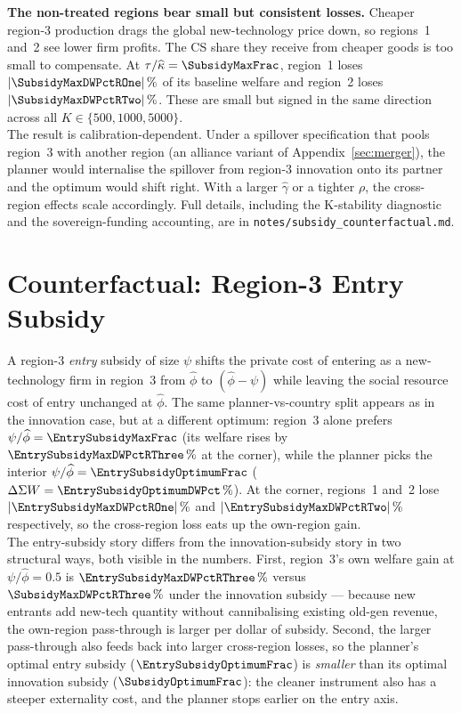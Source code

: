 \documentclass[12pt]{article}
\begin{document}
\textbf{The non-treated regions bear small but consistent losses.}
Cheaper region-3 production drags the global new-technology price down,
so regions~1 and~2 see lower firm profits. The CS share they receive
from cheaper goods is too small to compensate. At
$\tau / \widehat{\kappa} = \SubsidyMaxFrac$, region~1 loses
$|\SubsidyMaxDWPctROne|\,\%$ of its baseline welfare and region~2 loses
$|\SubsidyMaxDWPctRTwo|\,\%$. These are small but signed in the same
direction across all $K \in \{500, 1000, 5000\}$.\\

The result is calibration-dependent. Under a spillover specification
that pools region~3 with another region (an alliance variant of
Appendix~\ref{sec:merger}), the planner would internalise the spillover
from region-3 innovation onto its partner and the optimum would shift
right. With a larger $\widehat{\gamma}$ or a tighter $\rho$, the
cross-region effects scale accordingly. Full details, including the
K-stability diagnostic and the sovereign-funding accounting, are in
\texttt{notes/subsidy\_counterfactual.md}.

\section{Counterfactual: Region-3 Entry Subsidy}
\label{sec:entry_subsidy}

A region-3 \emph{entry} subsidy of size $\psi$ shifts the private cost
of entering as a new-technology firm in region~3 from $\widehat{\phi}$
to $(\widehat{\phi} - \psi)$ while leaving the social resource cost of
entry unchanged at $\widehat{\phi}$. The same planner-vs-country split
appears as in the innovation case, but at a different optimum: region~3
alone prefers $\psi / \widehat{\phi} = \EntrySubsidyMaxFrac$ (its
welfare rises by $\EntrySubsidyMaxDWPctRThree\,\%$ at the corner),
while the planner picks the interior $\psi / \widehat{\phi} =
\EntrySubsidyOptimumFrac$ ($\Delta\Sigma W =
\EntrySubsidyOptimumDWPct\,\%$). At the corner, regions~1 and~2 lose
$|\EntrySubsidyMaxDWPctROne|\,\%$ and $|\EntrySubsidyMaxDWPctRTwo|\,\%$
respectively, so the cross-region loss eats up the own-region gain.\\

The entry-subsidy story differs from the innovation-subsidy story in
two structural ways, both visible in the numbers. First, region~3's
own welfare gain at $\psi/\widehat{\phi} = 0.5$ is
$\EntrySubsidyMaxDWPctRThree\,\%$ versus $\SubsidyMaxDWPctRThree\,\%$
under the innovation subsidy --- because new entrants add new-tech
quantity without cannibalising existing old-gen revenue, the
own-region pass-through is larger per dollar of subsidy. Second, the
larger pass-through also feeds back into larger cross-region losses,
so the planner's optimal entry subsidy ($\EntrySubsidyOptimumFrac$) is
\emph{smaller} than its optimal innovation subsidy
($\SubsidyOptimumFrac$): the cleaner instrument also has a steeper
externality cost, and the planner stops earlier on the entry axis.
\end{document}
